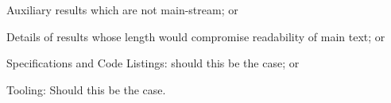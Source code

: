 \documentclass[
  oneside,
  11pt, a4paper,
  footinclude=true,
  headinclude=true,
  cleardoublepage=empty
]{scrbook}
\begin{document}
	
	

	Auxiliary results which are not main-stream; or

	Details of results whose length would compromise readability of main text; or

	Specifications and Code Listings: should this be the case; or

	Tooling: Should this be the case.



\end{document}
